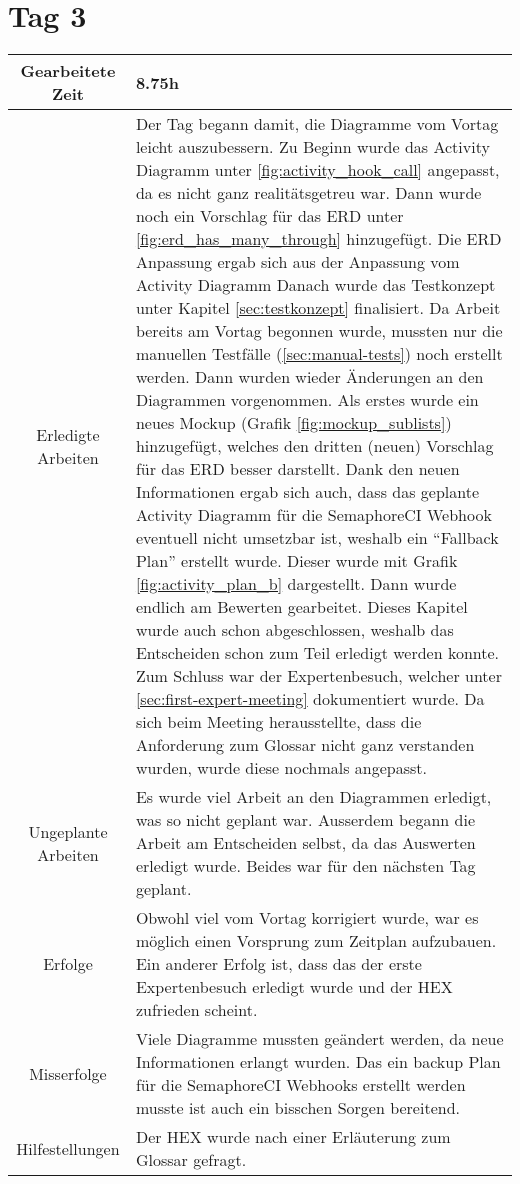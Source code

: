\section{Tag 3}
\begin{tabularx}{\textwidth}[H]{|c|X|}
  \hline
  Gearbeitete Zeit & 8.75h \\ \hline
  Erledigte Arbeiten & Der Tag begann damit, die Diagramme vom Vortag leicht auszubessern. Zu
  Beginn wurde das Activity Diagramm unter \ref{fig:activity_hook_call} angepasst, da es nicht
  ganz realitätsgetreu war. Dann wurde noch ein Vorschlag für das ERD unter
  \ref{fig:erd_has_many_through} hinzugefügt. Die ERD Anpassung ergab sich aus der Anpassung
  vom Activity Diagramm\newline
  Danach wurde das Testkonzept unter Kapitel \ref{sec:testkonzept} finalisiert. Da Arbeit bereits
  am Vortag begonnen wurde, mussten nur die manuellen Testfälle (\ref{sec:manual-tests}) noch erstellt
  werden. \newline
  Dann wurden wieder Änderungen an den Diagrammen vorgenommen. Als erstes wurde ein neues Mockup
  (Grafik \ref{fig:mockup_sublists}) hinzugefügt, welches den dritten (neuen) Vorschlag für das ERD
  besser darstellt. Dank den neuen Informationen ergab sich auch, dass das geplante Activity Diagramm
  für die SemaphoreCI Webhook eventuell nicht umsetzbar ist, weshalb ein \enquote{Fallback Plan}
  erstellt wurde. Dieser wurde mit Grafik \ref{fig:activity_plan_b} dargestellt. \newline
  Dann wurde endlich am Bewerten gearbeitet. Dieses Kapitel wurde auch schon abgeschlossen, weshalb
  das Entscheiden schon zum Teil erledigt werden konnte. \newline
  Zum Schluss war der Expertenbesuch, welcher unter \ref{sec:first-expert-meeting} dokumentiert wurde.
  Da sich beim Meeting herausstellte, dass die Anforderung zum Glossar nicht ganz verstanden wurden,
  wurde diese nochmals angepasst. \\ \hline
  Ungeplante Arbeiten & Es wurde viel Arbeit an den Diagrammen erledigt, was so nicht geplant war. Ausserdem
  begann die Arbeit am Entscheiden selbst, da das Auswerten erledigt wurde. Beides war für den nächsten Tag
  geplant. \\ \hline
  Erfolge & Obwohl viel vom Vortag korrigiert wurde, war es möglich einen Vorsprung zum Zeitplan aufzubauen.
  Ein anderer Erfolg ist, dass das der erste Expertenbesuch erledigt wurde und der HEX zufrieden scheint. \\ \hline
  Misserfolge & Viele Diagramme mussten geändert werden, da neue Informationen erlangt wurden. Das ein backup
  Plan für die SemaphoreCI Webhooks erstellt werden musste ist auch ein bisschen Sorgen bereitend. \\ \hline
  Hilfestellungen & Der HEX wurde nach einer Erläuterung zum Glossar gefragt. \\ \hline
\end{tabularx}

